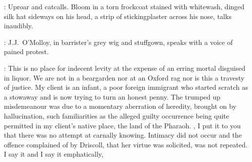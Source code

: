 :
Uproar and catcalls.
Bloom in a torn frockcoat stained with whitewash,
dinged silk hat sideways on his head,
a strip of stickingplaster across his nose, talks inaudibly.

:
J.J.~O'Molloy, in barrister's grey wig and stuffgown,
speaks with a voice of pained protest.

\JJOM:
This is no place for indecent levity at the
expense of an erring mortal disguised in liquor.
We are not in a beargarden nor at an Oxford rag
nor is this a travesty of justice.
My client is an infant, a poor foreign immigrant
who started scratch as a stowaway and is now trying to turn an honest penny.
The trumped up misdemeanour was due to a momentary aberration of heredity,
brought on by hallucination, such familiarities as the alleged guilty occurrence
being quite permitted in my client's native place, the land of the Pharaoh.
, I put it to you that there was no attempt at carnally knowing.
Intimacy did not occur and the offence complained of by Driscoll,
that her virtue was solicited, was not repeated.
% 
% 
% 
I say it and I say it emphatically,
